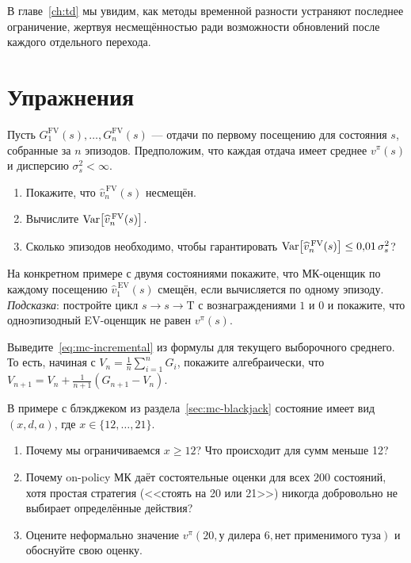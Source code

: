 В главе~\ref{ch:td} мы увидим, как методы временной разности устраняют последнее ограничение, жертвуя несмещённостью ради возможности обновлений после каждого отдельного перехода.

\section*{Упражнения}

\begin{exercise}
\label{ex:mc-fv-bias-variance}
Пусть $G_1^{\mathrm{FV}}(s), \dots, G_n^{\mathrm{FV}}(s)$ --- отдачи по первому посещению для состояния $s$, собранные за $n$ эпизодов.  Предположим, что каждая отдача имеет среднее $v^\pi(s)$ и дисперсию $\sigma_s^2 < \infty$.
\begin{enumerate}[label=(\alph*)]
  \item Покажите, что $\widehat{v}_n^{\,\mathrm{FV}}(s)$ несмещён.
  \item Вычислите $\operatorname{Var}\!\left[\widehat{v}_n^{\,\mathrm{FV}}(s)\right]$.
  \item Сколько эпизодов необходимо, чтобы гарантировать $\operatorname{Var}\!\left[\widehat{v}_n^{\,\mathrm{FV}}(s)\right] \le 0{,}01\,\sigma_s^2$?
\end{enumerate}
\end{exercise}

\begin{exercise}
\label{ex:mc-ev-bias}
На конкретном примере с двумя состояниями покажите, что МК-оценщик по каждому посещению $\widehat{v}_1^{\,\mathrm{EV}}(s)$ смещён, если вычисляется по одному эпизоду.  \emph{Подсказка}: постройте цикл $s \to s \to \mathrm{T}$ с вознаграждениями $1$ и $0$ и покажите, что одноэпизодный EV-оценщик не равен $v^\pi(s)$.
\end{exercise}

\begin{exercise}
\label{ex:mc-incremental}
Выведите~\eqref{eq:mc-incremental} из формулы для текущего выборочного среднего.  То есть, начиная с $V_n = \frac{1}{n}\sum_{i=1}^n G_i$, покажите алгебраически, что $V_{n+1} = V_n + \frac{1}{n+1}(G_{n+1} - V_n)$.
\end{exercise}

\begin{exercise}
\label{ex:mc-blackjack}
В примере с блэкджеком из раздела~\ref{sec:mc-blackjack} состояние имеет вид $(x, d, a)$, где $x \in \{12,\dots,21\}$.
\begin{enumerate}[label=(\alph*)]
  \item Почему мы ограничиваемся $x \ge 12$?  Что происходит для сумм меньше 12?
  \item Почему on-policy МК даёт состоятельные оценки для всех $200$ состояний, хотя простая стратегия (<<стоять на 20 или 21>>) никогда добровольно не выбирает определённые действия?
  \item Оцените неформально значение $v^\pi(20, \text{у дилера 6}, \text{нет применимого туза})$ и обоснуйте свою оценку.
\end{enumerate}
\end{exercise}

